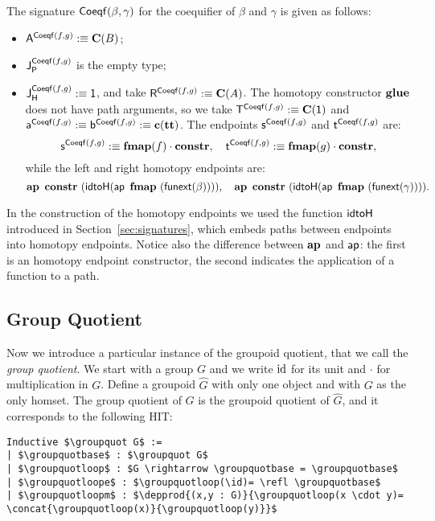 The signature $\coequifier \beta \gamma$ for the coequifier of $\beta$
and $\gamma$ is given as follows:
\begin{itemize}
\item $\pointconstr[\coequifier f g] \eqdef \constantP{B}$;
\item $\pathlabel[\coequifier f g]$ is the empty type; 
\item $\homotlabel[\coequifier f g] \eqdef \unit$, and take 
  $\homotpointarg[\coequifier f g] \eqdef \constantP{A}$.
  The homotopy constructor $\coequifierglue$ does not have path arguments, so we take  
  $\homotpathtarg[\coequifier f g] \eqdef \constantP{\unit}$ and
  $\pathargleft[\coequifier f g] \eqdef \pathargright[\coequifier f g] \eqdef \Ce(\unitt)$.
  The endpoints $\homotpathleft[\coequifier f g]$ and $\homotpathright[\coequifier f g]$ are:
  \[
  \homotpathleft[\coequifier f g] \eqdef \comp{\fmap(f)}{\constr}, \quad
  \homotpathright[\coequifier f g] \eqdef \comp{\fmap(g)}{\constr},
  \]
  while the left and right homotopy endpoints are:
  \[
  \hap{\constr}{(\idtoH(\ap{\fmap}{(\funextsec(\beta))}))}, \quad
  \hap{\constr}{(\idtoH(\ap{\fmap}{(\funextsec(\gamma))}))}.
  \]
\end{itemize}
In the construction of the homotopy endpoints we used the function
$\idtoH$ introduced in Section~\ref{sec:signatures}, which embeds
paths between endpoints into homotopy endpoints. Notice also the
difference between $\constructor{ap}$ and $\constfont{ap}$: the first
is an homotopy endpoint constructor, the second indicates the
application of a function to a path.


\subsection{Group Quotient}
\label{sec:group_quotient}

Now we introduce a particular instance of the groupoid quotient, that
we call the \emph{group quotient}. We start with a group $G$ and we write $\id$ 
for its unit and $\cdot$ for multiplication in $G$. Define a groupoid $\widehat{G}$
with only one object and with $G$ as the only homset. The group
quotient of $G$ is the groupoid quotient of $\widehat{G}$, and it
corresponds to the following HIT:
\begin{lstlisting}[mathescape=true]
Inductive $\groupquot G$ :=
| $\groupquotbase$ : $\groupquot G$
| $\groupquotloop$ : $G \rightarrow \groupquotbase = \groupquotbase$
| $\groupquotloope$ : $\groupquotloop(\id)= \refl \groupquotbase$
| $\groupquotloopm$ : $\depprod{(x,y : G)}{\groupquotloop(x \cdot y)= \concat{\groupquotloop(x)}{\groupquotloop(y)}}$
\end{lstlisting}

